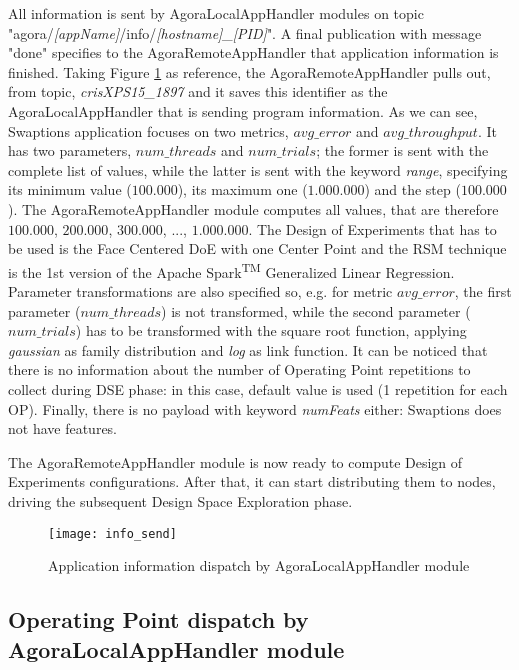 All information is sent by AgoraLocalAppHandler modules on topic "agora\slash{}\textit{[appName]}\slash{}info\slash{}\textit{[hostname]\_[PID]}". A final publication with message "done" specifies to the AgoraRemoteAppHandler that application information is finished. Taking Figure \ref{fig:info_send} as reference, the AgoraRemoteAppHandler pulls out, from topic, \textit{crisXPS15\_1897} and it saves this identifier as the AgoraLocalAppHandler that is sending program information. As we can see, Swaptions application focuses on two metrics, $avg\_error$ and $avg\_throughput$. It has two parameters, $num\_threads$ and $num\_trials$; the former is sent with the complete list of values, while the latter is sent with the keyword \textit{range}, specifying its minimum value ($100.000$), its maximum one ($1.000.000$) and the step ($100.000$). The Agora\-Remote\-App\-Handler module computes all values, that are therefore $100.000$, $200.000$, $300.000$, ..., $1.000.000$. The Design of Experiments that has to be used is the Face Centered DoE with one Center Point and the RSM technique is the 1st version of the Apache Spark\textsuperscript{TM} Generalized Linear Regression. Parameter transformations are also specified so, e.g. for metric $avg\_error$, the first parameter ($num\_threads$) is not transformed, while the second parameter ($num\_trials$) has to be transformed with the square root function, applying \textit{gaussian} as family distribution and \textit{log} as link function. It can be noticed that there is no information about the number of Operating Point repetitions to collect during DSE phase: in this case, default value is used (1 repetition for each OP). Finally, there is no payload with keyword \textit{numFeats} either: Swaptions does not have features.

The AgoraRemoteAppHandler module is now ready to compute Design of Experiments configurations. After that, it can start distributing them to nodes, driving the subsequent Design Space Exploration phase.

\begin{figure}[t]

    \centering
    \texttt{[image: info\_send]}
    \caption{Application information dispatch by AgoraLocalAppHandler module}
    \label{fig:info_send}
    
\end{figure}





\subsection{Operating Point dispatch by AgoraLocalAppHandler module}\label{opSend}

